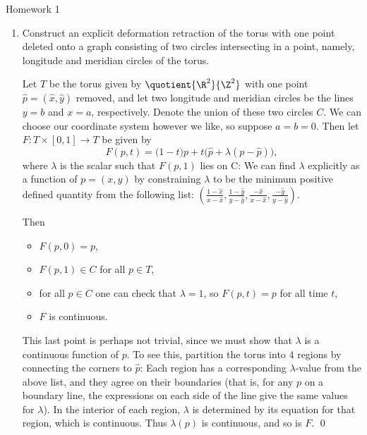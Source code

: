 \documentclass[12pt,letterpaper]{article}
\begin{document}
\pagestyle{fancy}
\begin{center}
{\Large Homework 1}%
\end{center}

\begin{enumerate}
\item Construct an explicit deformation retraction of the torus with one point deleted
onto a graph consisting of two circles intersecting in a point, namely, longitude and
meridian circles of the torus.

\answer
Let $T$ be the torus given by $\quotient{\R^2}{\Z^2}$ with one point $\hat p=(\hat{x},\hat{y})$ removed, and let two longitude and meridian circles be the lines $y=b$ and $x=a$, respectively. Denote the union of these two circles $C$.
We can choose our coordinate system however we like, so \Wlog{} suppose $a=b=0$. Then let $F:T\times [0,1]\to T$ be given by 
$$F(p,t)=\big(1-t\big)p+t\big(\hat{p}+\lambda(p-\hat p)\big),$$
where $\lambda$ is the scalar such that $F(p,1)$ lies on C:%
We can find $\lambda$ explicitly as a function of $p=(x,y)$ by constraining $\lambda$ to be the minimum positive defined quantity from the following list: $\left(\frac{1-\hat x}{x-\hat x}, \frac{1-\hat y}{y-\hat y},\frac{-\hat x}{x-\hat x}, \frac{-\hat y}{y-\hat y}\right)$. 

Then 
\begin{itemize}
\item $F(p,0)=p$, 
\item $F(p,1)\in C$ for all $p\in T$, 
\item for all $p\in C$ one can check that $\lambda=1$, so $F(p,t)=p$ for all time $t$,
\item $F$ is continuous. 
\end{itemize}
This last point is perhaps not trivial, since we must show that $\lambda$ is a continuous function of $p$. To see this, partition the torus into 4 regions by connecting the corners to $\hat p$: 
Each region has a corresponding $\lambda$-value from the above list, and they agree on their boundaries (that is, for any $p$ on a boundary line, the expressions on each side of the line give the same values for $\lambda$). In the interior of each region, $\lambda$ is determined by its equation for that region, which is continuous. Thus $\lambda(p)$ is continuous, and so is $F$. 
\qed


\end{enumerate}
\end{document}
